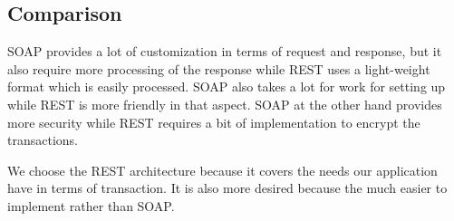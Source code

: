 \subsection{Comparison}
SOAP provides a lot of customization in terms of request and response, but it also require more processing of the response while REST uses a light-weight format which is easily processed. SOAP also takes a lot for work for setting up while REST is more friendly in that aspect. SOAP at the other hand provides more security while REST requires a bit of implementation to encrypt the transactions.

We choose the REST architecture because it covers the needs our application have in terms of transaction. It is also more desired because the much easier to implement rather than SOAP.